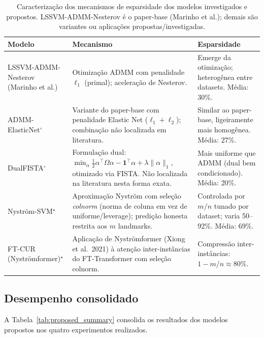 \documentclass[12pt,a4paper]{article}
\begin{document}
\begin{table}[H]
\centering
\caption{Caracterização dos mecanismos de esparsidade dos modelos investigados
e propostos. LSSVM-ADMM-Nesterov é o paper-base (Marinho et al.); demais são
variantes ou aplicações propostas/investigadas.}
\label{tab:mechanisms}
\begin{tabular}{lp{4.5cm}p{4.5cm}}
\toprule
\textbf{Modelo} & \textbf{Mecanismo} & \textbf{Esparsidade} \\
\midrule
LSSVM-ADMM-Nesterov (Marinho et al.)
  & Otimização ADMM com penalidade $\ell_1$ (primal); aceleração de Nesterov.
  & Emerge da otimização; heterogênea entre datasets. Média: 30\%. \\
\addlinespace
ADMM-ElasticNet$^\circ$
  & Variante do paper-base com penalidade Elastic Net ($\ell_1+\ell_2$);
    combinação não localizada em literatura.
  & Similar ao paper-base, ligeiramente mais homogênea. Média: 27\%. \\
\addlinespace
DualFISTA$^\circ$
  & Formulação dual:
    $\min_\alpha \frac{1}{2}\alpha^\top\Omega\alpha - \mathbf{1}^\top\alpha + \lambda\|\alpha\|_1$,
    otimizado via FISTA. Não localizada na literatura nesta forma exata.
  & Mais uniforme que ADMM (dual bem condicionado). Média: 20\%. \\
\addlinespace
Nyström-SVM$^\star$
  & Aproximação Nyström com seleção \emph{colnorm} (norma de coluna em vez
    de uniforme/leverage); predição honesta restrita aos $m$ landmarks.
  & Controlada por $m/n$ tunado por dataset; varia 50--92\%. Média: 69\%. \\
\addlinespace
FT-CUR (Nyströmformer)$^\star$
  & Aplicação de Nyströmformer (Xiong et al.\ 2021) à atenção inter-instâncias
    do FT-Transformer com seleção colnorm.
  & Compressão inter-instâncias: $1 - m/n \approx 80\%$. \\
\bottomrule
\end{tabular}
\end{table}

\subsection{Desempenho consolidado}

A Tabela~\ref{tab:proposed_summary} consolida os resultados dos modelos propostos
nos quatro experimentos realizados.
\end{document}
